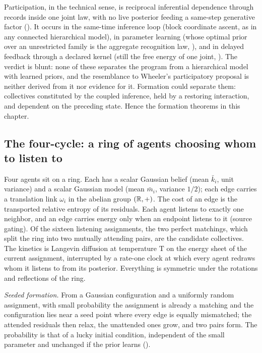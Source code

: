 Participation, in the technical sense, is reciprocal inferential dependence through records inside one
joint law, with no live posterior feeding a same-step generative factor ().
It occurs in the same-time inference loop (block coordinate ascent, as in any connected hierarchical
model), in parameter learning (whose optimal prior over an unrestricted family is the aggregate
recognition law, ), and in delayed feedback through a declared kernel (still
the free energy of one joint, ). The verdict is blunt: none of
these separates the program from a hierarchical model with learned priors, and the resemblance to
Wheeler's participatory proposal \citep{Wheeler1990} is neither derived from it nor evidence for it.
Formation could separate them: collectives constituted by the coupled inference, held by a restoring
interaction, and dependent on the preceding state. Hence the formation theorems in this chapter.

\subsection{The four-cycle: a ring of agents choosing whom to listen to}

Four agents sit on a ring. Each has a scalar Gaussian belief (mean $\bar k_i$, unit variance) and a
scalar Gaussian model (mean $\bar m_i$, variance $1/2$); each edge carries a translation link $\omega_i$
in the abelian group $(\mathbb R,+)$. The cost of an edge is the transported relative entropy of its residuals.
Each agent listens to exactly one neighbor, and an edge carries energy only when an endpoint listens to
it (source gating). Of the sixteen listening assignments, the two perfect matchings, which split the ring
into two mutually attending pairs, are the candidate collectives. The kinetics is Langevin diffusion at
temperature $\mathrm T$ on the energy sheet of the current assignment, interrupted by a rate-one clock at
which every agent redraws whom it listens to from its posterior. Everything is symmetric under the
rotations and reflections of the ring.

\emph{Seeded formation.} From a Gaussian configuration and a uniformly random assignment, with small
probability the assignment is already a matching and the configuration lies near a seed point where every
edge is equally mismatched; the attended residuals then relax, the unattended ones grow, and two pairs
form. The probability is that of a lucky initial condition, independent of the small parameter and
unchanged if the prior learns ().

